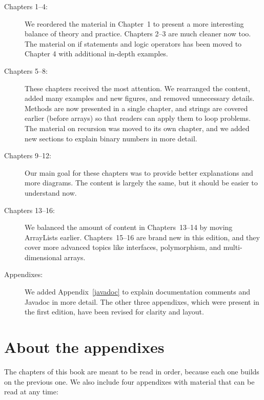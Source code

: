 \begin{description}

\item[Chapters 1--4:]

We reordered the material in Chapter~1 to present a more interesting balance of theory and practice.
Chapters 2--3 are much cleaner now too.
The material on if statements and logic operators has been moved to Chapter 4 with additional in-depth examples.

\item[Chapters 5--8:]

These chapters received the most attention.
We rearranged the content, added many examples and new figures, and removed unnecessary details.
Methods are now presented in a single chapter, and strings are covered earlier (before arrays) so that readers can apply them to loop problems.
The material on recursion was moved to its own chapter, and we added new sections to explain binary numbers in more detail.

\item[Chapters 9--12:]

Our main goal for these chapters was to provide better explanations and more diagrams.
The content is largely the same, but it should be easier to understand now.

\item[Chapters 13--16:]

We balanced the amount of content in Chapters~13--14 by moving ArrayLists earlier.
Chapters~15--16 are brand new in this edition, and they cover more advanced topics like interfaces, polymorphism, and multi-dimensional arrays.

\item[Appendixes:]

We added Appendix~\ref{javadoc} to explain documentation comments and Javadoc in more detail.
The other three appendixes, which were present in the first edition, have been revised for clarity and layout.

\end{description}


\section*{About the appendixes}

The chapters of this book are meant to be read in order, because each one builds on the previous one.
We also include four appendixes with material that can be read at any time:

